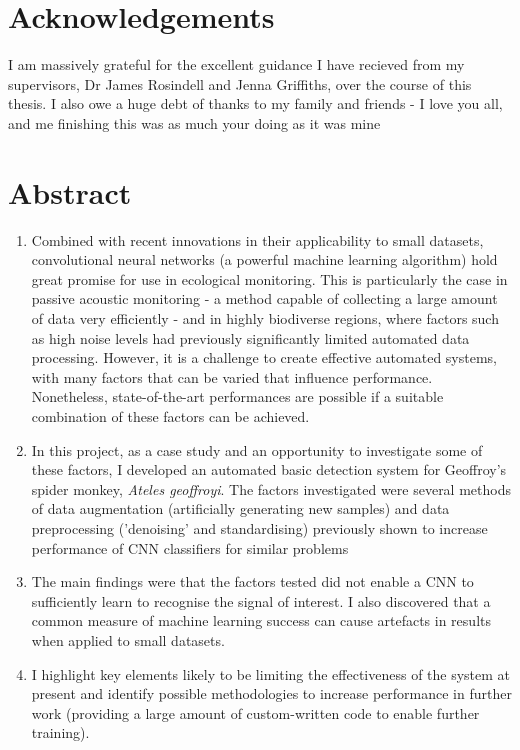 \documentclass[11pt]{article}
\begin{document}
\section*{Acknowledgements}
I am massively grateful for the excellent guidance I have recieved from my supervisors, Dr James Rosindell and Jenna Griffiths, over the course of this thesis. I also owe a huge debt of thanks to my family and friends - I love you all, and me finishing this was as much your doing as it was mine 
\newpage

\linenumbers

\section{Abstract}

\begin{enumerate}

\item Combined with recent innovations in their applicability to small datasets, convolutional neural networks (a powerful machine learning algorithm) hold great promise for use in ecological monitoring. This is particularly the case in passive acoustic monitoring - a method capable of collecting a large amount of data very efficiently - and in highly biodiverse regions, where factors such as high noise levels had previously significantly limited automated data processing. However, it is a challenge to create effective automated systems, with many factors that can be varied that influence performance. Nonetheless, state-of-the-art performances are possible if a suitable combination of these factors can be achieved.

\item In this project, as a case study and an opportunity to investigate some of these factors, I developed an automated basic detection system for Geoffroy’s spider monkey, \textit{Ateles geoffroyi}. The factors investigated were several methods of data augmentation (artificially generating new samples) and data preprocessing ('denoising' and standardising) previously shown to increase performance of CNN classifiers for similar problems    

\item The main findings were that the factors tested did not enable a CNN to sufficiently learn to recognise the signal of interest. I also discovered that a common measure of machine learning success can cause artefacts in results when applied to small datasets. 

\item I highlight key elements likely to be limiting the effectiveness of the system at present and identify possible methodologies to increase performance in further work (providing a large amount of custom-written code to enable further training).

\end{enumerate}
\end{document}
